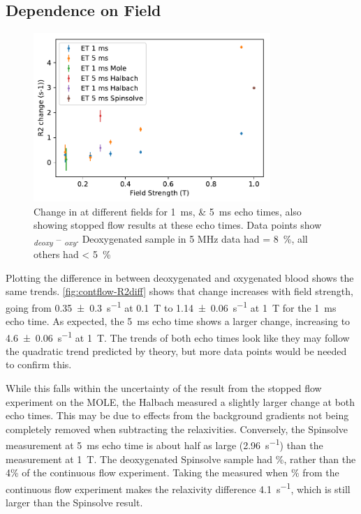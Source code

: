 \subsection{Dependence on Field}
\label{sec:contflow-fielddep}
\begin{figure}[ht]
\centering
\includegraphics[width=0.8\textwidth]{figures/contflow/R2fieldDep.pdf}
\caption[Change in \Rtwo at different fields]{Change in \Rtwo at different fields for \SIlist{1;5}{ms} echo times, also showing stopped flow results at these echo times. Data points show \Rtwo\textsubscript{\textit{deoxy}} -- \Rtwo\textsubscript{\textit{oxy}}. Deoxygenated sample in 5 MHz data had \SOtwo = \SI{8}{\percent}, all others had \SOtwo < \SI{5}{\percent}}
\label{fig:contflow-R2diff}
\end{figure}

Plotting the difference in \Rtwo between deoxygenated and oxygenated blood shows the same trends.
\autoref{fig:contflow-R2diff} shows that \Rtwo change increases with field strength, going from \SI{0.35\pm0.3}{s^{-1}} at \SI{0.1}{T} to \SI{1.14\pm0.06}{s^{-1}} at \SI{1}{T} for the \SI{1}{ms} echo time.
As expected, the \SI{5}{ms} echo time shows a larger \Rtwo change, increasing to \SI{4.6\pm0.06}{s^{-1}} at \SI{1}{T}.
The trends of both echo times look like they may follow the quadratic trend predicted by theory, but more data points would be needed to confirm this.

While this falls within the uncertainty of the result from the stopped flow experiment on the MOLE, the Halbach measured a slightly larger \Rtwo change at both echo times.
This may be due to effects from the background gradients not being completely removed when subtracting the relaxivities.
Conversely, the Spinsolve measurement at \SI{5}{ms} echo time is about half as large (\SI{2.96}{s^{-1}}) than the measurement at \SI{1}{T}.
The deoxygenated Spinsolve sample had \%, rather than the 4\% of the continuous flow experiment.
Taking the measured \Rtwo when \%  from the continuous flow experiment makes the relaxivity difference \SI{4.1}{s^{-1}}, which is still larger than the Spinsolve result.

